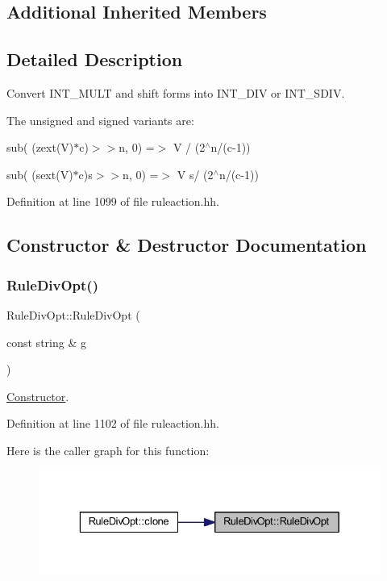 \subsection*{Additional Inherited Members}


\subsection{Detailed Description}
Convert I\+N\+T\+\_\+\+M\+U\+LT and shift forms into I\+N\+T\+\_\+\+D\+IV or I\+N\+T\+\_\+\+S\+D\+IV. 

The unsigned and signed variants are\+:
\begin{DoxyItemize}
\item {\ttfamily sub( (zext(\+V)$\ast$c)$>$$>$n, 0) =$>$ V / (2$^\wedge$n/(c-\/1))}
\item {\ttfamily sub( (sext(\+V)$\ast$c)s$>$$>$n, 0) =$>$ V s/ (2$^\wedge$n/(c-\/1))} 
\end{DoxyItemize}

Definition at line 1099 of file ruleaction.\+hh.



\subsection{Constructor \& Destructor Documentation}
\mbox{\label{class_rule_div_opt_a13ab29d84fa1b5155760bd55ef5d5ad6}} 
\subsubsection{\texorpdfstring{RuleDivOpt()}{RuleDivOpt()}}
{\footnotesize\ttfamily Rule\+Div\+Opt\+::\+Rule\+Div\+Opt (\begin{DoxyParamCaption}\item[{const string \&}]{g }\end{DoxyParamCaption})\hspace{0.3cm}{\ttfamily [inline]}}



\mbox{\hyperlink{class_constructor}{Constructor}}. 



Definition at line 1102 of file ruleaction.\+hh.

Here is the caller graph for this function\+:
\nopagebreak
\begin{figure}[H]
\begin{center}
\leavevmode
\includegraphics[width=329pt]{class_rule_div_opt_a13ab29d84fa1b5155760bd55ef5d5ad6_icgraph}
\end{center}
\end{figure}


